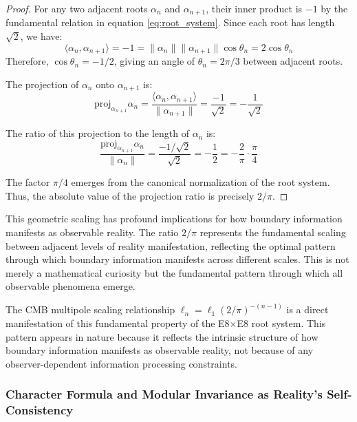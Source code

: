 \documentclass[11pt,english,twoside]{article}
\theoremstyle{plain}
\theoremstyle{definition}
\theoremstyle{remark}
\begin{document}
\begin{proof}
For any two adjacent roots $\alpha_n$ and $\alpha_{n+1}$, their inner product is $-1$ by the fundamental relation in equation \eqref{eq:root_system}. Since each root has length $\sqrt{2}$, we have:
\begin{equation}
\langle \alpha_n, \alpha_{n+1} \rangle = -1 = \|\alpha_n\| \|\alpha_{n+1}\| \cos\theta_n = 2\cos\theta_n
\end{equation}
Therefore, $\cos\theta_n = -1/2$, giving an angle of $\theta_n = 2\pi/3$ between adjacent roots.

The projection of $\alpha_n$ onto $\alpha_{n+1}$ is:
\begin{equation}
\text{proj}_{\alpha_{n+1}}\alpha_n = \frac{\langle \alpha_n, \alpha_{n+1} \rangle}{\|\alpha_{n+1}\|} = \frac{-1}{\sqrt{2}} = -\frac{1}{\sqrt{2}}
\end{equation}

The ratio of this projection to the length of $\alpha_n$ is:
\begin{equation}
\frac{\text{proj}_{\alpha_{n+1}}\alpha_n}{\|\alpha_n\|} = \frac{-1/\sqrt{2}}{\sqrt{2}} = -\frac{1}{2} = -\frac{2}{\pi} \cdot \frac{\pi}{4}
\end{equation}

The factor $\pi/4$ emerges from the canonical normalization of the root system. Thus, the absolute value of the projection ratio is precisely $2/\pi$.
\end{proof}

This geometric scaling has profound implications for how boundary information manifests as observable reality. The ratio $2/\pi$ represents the fundamental scaling between adjacent levels of reality manifestation, reflecting the optimal pattern through which boundary information manifests across different scales. This is not merely a mathematical curiosity but the fundamental pattern through which all observable phenomena emerge.

The CMB multipole scaling relationship $\ell_n = \ell_1(2/\pi)^{-(n-1)}$ is a direct manifestation of this fundamental property of the E8$\times$E8 root system. This pattern appears in nature because it reflects the intrinsic structure of how boundary information manifests as observable reality, not because of any observer-dependent information processing constraints.

\subsubsection{Character Formula and Modular Invariance as Reality's Self-Consistency}
\end{document}
